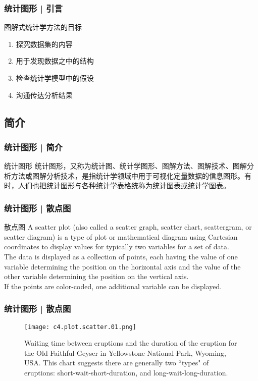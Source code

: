 \begin{frame}
  \frametitle{统计图形 | 引言}
  \begin{block}{\alert{图解式统计学方法的目标}}
    \begin{enumerate}
      \item 探究数据集的内容
      \item 用于发现数据之中的结构
      \item 检查统计学模型中的假设
      \item 沟通传达分析结果
    \end{enumerate}
  \end{block}
\end{frame}

\subsection{简介}
\begin{frame}
  \frametitle{统计图形 | 简介}
  \begin{block}{统计图形}
统计图形，又称为统计图、统计学图形、图解方法、图解技术、图解分析方法或图解分析技术，是指统计学领域中用于可视化定量数据的信息图形。有时，人们也把统计图形与各种统计学表格统称为统计图表或统计学图表。
  \end{block}
\end{frame}

\begin{frame}
  \frametitle{统计图形 | 散点图}
  \begin{block}{散点图}
    A scatter plot (also called a scatter graph, scatter chart, scattergram, or scatter diagram) is a type of plot or mathematical diagram using Cartesian coordinates to display values for typically two variables for a set of data.\\
    \vspace{0.5em}
    The data is displayed as a collection of points, each having the value of one variable determining the position on the horizontal axis and the value of the other variable determining the position on the vertical axis.\\
    \vspace{0.5em}
    If the points are color-coded, one additional variable can be displayed.
  \end{block}
\end{frame}

\begin{frame}
  \frametitle{统计图形 | 散点图}
  \begin{figure}
    \centering
    \texttt{[image: c4.plot.scatter.01.png]}
    \caption{Waiting time between eruptions and the duration of the eruption for the Old Faithful Geyser in Yellowstone National Park, Wyoming, USA. This chart suggests there are generally two ``types" of eruptions: short-wait-short-duration, and long-wait-long-duration.}
  \end{figure}
\end{frame}

